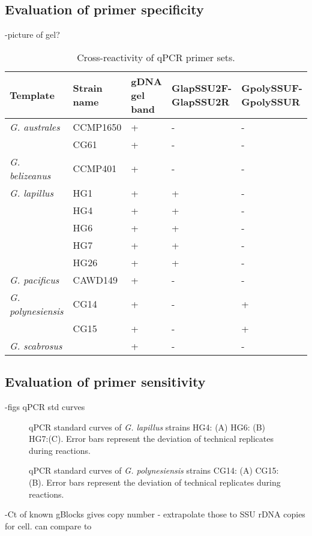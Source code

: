 \documentclass[12pt]{article}
\begin{document}
\subsection{Evaluation of primer specificity}
-picture of gel?
\FloatBarrier
\begin{table}
\caption{Cross-reactivity of qPCR primer sets.}
\label{tbl:CrossreactTable}
\begin{tabular}{ | p{4cm} | p{3cm} | p{2cm} | p{2.5cm} | p{2.5cm} | }
\hline
\textbf{Template} & \textbf{Strain name} & \textbf{gDNA gel band} & \textbf{GlapSSU2F-GlapSSU2R} & \textbf{GpolySSUF-GpolySSUR} \\
\hline
\emph{G. australes} & CCMP1650 &+&-&- \\
\hline
& CG61 &+&-&- \\
\hline
\emph{G. belizeanus}&CCMP401&+&-&-\\
\hline
\emph{G. lapillus}&HG1&+&+&-\\
\hline
&HG4&+&+&-\\
\hline
&HG6&+&+&-\\
\hline
&HG7&+&+&-\\
\hline
&HG26&+&+&-\\
\hline
\emph{G. pacificus}&CAWD149&+&-&-\\
\hline
\emph{G. polynesiensis}&CG14&+&-&+\\
\hline
&CG15&+&-&+\\
\hline
\emph{G. scabrosus}&&+&-&-\\
\hline
\end{tabular}
\end{table}
\FloatBarrier
 
\subsection{Evaluation of primer sensitivity}
-figs qPCR std curves
\FloatBarrier
\begin{figure}
\caption{qPCR standard curves of \emph{G. lapillus} strains HG4: (A) HG6: (B) HG7:(C). Error bars represent the deviation of technical replicates during reactions.}
\label{fig:lapiStd}
\end{figure}
\FloatBarrier
\FloatBarrier
\begin{figure}
\caption{qPCR standard curves of \emph{G. polynesiensis} strains CG14: (A) CG15: (B). Error bars represent the deviation of technical replicates during reactions.}
\label{fig:polyStd}
\end{figure}
\FloatBarrier
-Ct of known gBlocks gives copy number - extrapolate those to SSU rDNA copies for cell. can compare to
\end{document}
